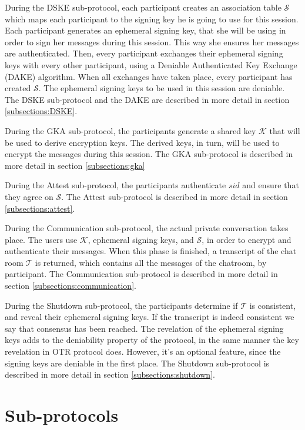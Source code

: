 During the DSKE sub-protocol, each participant creates an association table $\mathcal{S}$ which maps each participant to the signing key he is going to use for this session. Each participant generates an ephemeral signing key, that she will be using in order to sign her messages during this session. This way she ensures her messages are authenticated. Then, every participant exchanges their ephemeral signing keys with every other participant, using a Deniable Authenticated Key Exchange (DAKE) algorithm. When all exchanges have taken place, every participant has created $\mathcal{S}$. The ephemeral signing keys to be used in this session are deniable. The DSKE sub-protocol and the DAKE are described in more detail in section \ref{subsections:DSKE}.

During the GKA sub-protocol, the participants generate a shared key $\mathcal{K}$ that will be used to derive encryption keys. The derived keys, in turn, will be used to encrypt the messages during this session. The GKA sub-protocol is described in more detail in section \ref{subsections:gka}

During the Attest sub-protocol, the participants authenticate $sid$ and ensure that they agree on $\mathcal{S}$. The Attest sub-protocol is described in more detail in section \ref{subsections:attest}. 

During the Communication sub-protocol, the actual private conversation takes place. The users use $\mathcal{K}$, ephemeral signing keys, and $\mathcal{S}$, in order to encrypt and authenticate their messages. When this phase is finished, a transcript of the chat room $\mathcal{T}$ is returned, which contains all the messages of the chatroom, by participant. The Communication sub-protocol is described in more detail in section \ref{subsections:communication}. 

During the Shutdown sub-protocol, the participants determine if $\mathcal{T}$ is consistent, and reveal their ephemeral signing keys. If the transcript is indeed consistent we say that consensus has been reached. The revelation of the ephemeral signing keys adds to the deniability property of the protocol, in the same manner the key revelation in OTR protocol does. However, it’s an optional feature, since the signing keys are deniable in the first place. The Shutdown sub-protocol is described in more detail in section \ref{subsections:shutdown}. 


\section{Sub-protocols}

